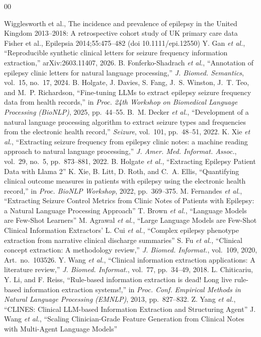 \documentclass[conference]{IEEEtran}
\begin{document}
\begin{thebibliography}{00}

 Wigglesworth et al., The incidence and prevalence of epilepsy in the United Kingdom 2013–2018: A retrospective cohort study of UK primary care data
 Fisher et al., Epilepsia 2014;55:475–482 (doi 10.1111/epi.12550)
 Y. Gan \emph{et al.}, ``Reproducible synthetic clinical letters for seizure frequency information extraction,'' arXiv:2603.11407, 2026.
 B. Fonferko-Shadrach \emph{et al.}, ``Annotation of epilepsy clinic letters for natural language processing,'' \emph{J. Biomed. Semantics}, vol.~15, no.~17, 2024.
 B. Holgate, J. Davies, S. Fang, J.~S. Winston, J.~T. Teo, and M.~P. Richardson, ``Fine-tuning LLMs to extract epilepsy seizure frequency data from health records,'' in \emph{Proc. 24th Workshop on Biomedical Language Processing (BioNLP)}, 2025, pp.~44--55.
 B.~M. Decker \emph{et al.}, ``Development of a natural language processing algorithm to extract seizure types and frequencies from the electronic health record,'' \emph{Seizure}, vol.~101, pp.~48--51, 2022.
 K. Xie \emph{et al.}, ``Extracting seizure frequency from epilepsy clinic notes: a machine reading approach to natural language processing,'' \emph{J. Amer. Med. Informat. Assoc.}, vol.~29, no.~5, pp.~873--881, 2022.
 B. Holgate \emph{et al.}, ``Extracting Epilepsy Patient Data with Llama 2'' 
 K. Xie, B. Litt, D. Roth, and C.~A. Ellis, ``Quantifying clinical outcome measures in patients with epilepsy using the electronic health record,'' in \emph{Proc. BioNLP Workshop}, 2022, pp.~369--375.
 M. Fernandes \emph{et al.},  ``Extracting Seizure Control Metrics from Clinic Notes of Patients with Epilepsy: a Natural Language Processing Approach'' 
 T. Brown \emph{et al.},  ``Language Models are Few-Shot Learners'' 
 M. Agrawal \emph{et al.},  ``Large Language Models are Few-Shot Clinical Information Extractors' 
 L. Cui \emph{et al.},  ``Complex epilepsy phenotype extraction from narrative clinical discharge summaries'' 
 S. Fu \emph{et al.}, ``Clinical concept extraction: A methodology review,'' \emph{J. Biomed. Informat.}, vol.~109, 2020, Art.~no.~103526.
 Y. Wang \emph{et al.}, ``Clinical information extraction applications: A literature review,'' \emph{J. Biomed. Informat.}, vol.~77, pp.~34--49, 2018.
 L. Chiticariu, Y. Li, and F. Reiss, ``Rule-based information extraction is dead! Long live rule-based information extraction systems!,'' in \emph{Proc. Conf. Empirical Methods in Natural Language Processing (EMNLP)}, 2013, pp.~827--832.
 Z. Yang \emph{et al.},  ``CLINES: Clinical LLM-based Information Extraction and Structuring Agent'' 
 J. Wang \emph{et al.},  ``Scaling Clinician-Grade Feature Generation from Clinical Notes with Multi-Agent Language Models'' 

\end{thebibliography}

\vspace{12pt}
\end{document}
